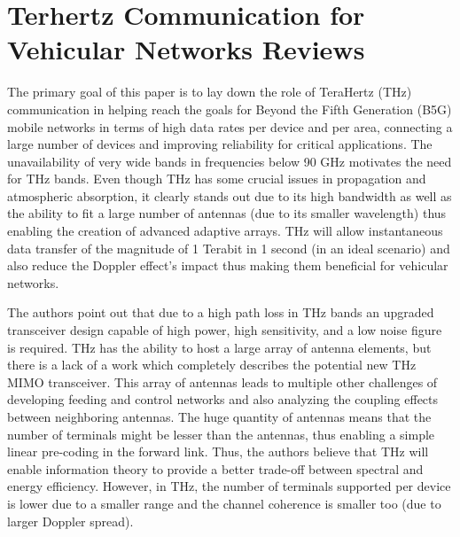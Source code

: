 \documentclass[12pt, letterpaper]{article}
\begin{document}
\section{Terhertz Communication for Vehicular Networks Reviews}
\par
The primary goal of this paper is to lay down the role of TeraHertz (THz) communication in helping reach the goals for Beyond the Fifth Generation (B5G) mobile networks in terms of high data rates per device and per area, connecting a large number of devices and improving reliability for critical applications. The unavailability of very wide bands in frequencies below 90 GHz motivates the need for THz bands. Even though THz has some crucial issues in propagation and atmospheric absorption, it clearly stands out due to its high bandwidth as well as the ability to fit a large number of antennas (due to its smaller wavelength) thus enabling the creation of advanced adaptive arrays. THz will allow instantaneous data transfer of the magnitude of 1 Terabit in 1 second (in an ideal scenario) and also reduce the Doppler effect's impact thus making them beneficial for vehicular networks.
\par
The authors point out that due to a high path loss in THz bands an upgraded transceiver design capable of high power, high sensitivity, and a low noise figure is required. THz has the ability to host a large array of antenna elements, but there is a lack of a work which completely describes the potential new THz MIMO transceiver. This array of antennas leads to multiple other challenges of developing feeding and control networks and also analyzing the coupling effects between neighboring antennas. The huge quantity of antennas means that the number of terminals might be lesser than the antennas, thus enabling a simple linear pre-coding in the forward link. Thus, the authors believe that THz will enable information theory to provide a better trade-off between spectral and energy efficiency. However, in THz, the number of terminals supported per device is lower due to a smaller range and the channel coherence is smaller too (due to larger Doppler spread). 
\par
\end{document}
